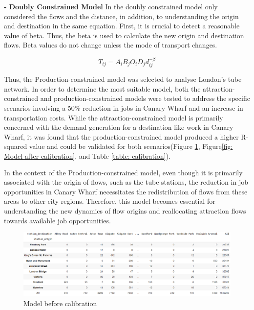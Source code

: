 \documentclass[10pt]{report}
\numberwithin{figure}{section}
\numberwithin{table}{section}
\begin{document}
\vspace{5mm} %
\textbf{- Doubly Constrained Model}
 In the doubly constrained model only considered the flows and the distance, in addition, to understanding the origin and destination in the same equation. First, it is crucial to detect a reasonable value of beta. Thus, the beta is used to calculate the new origin and destination flows. Beta values do not change unless the mode of transport changes. 

\begin{equation} \tag{4}
T_{ij} = A_i B_j O_i D_j d_{ij}^{-\beta}
\end{equation}

\newpage 

Thus, the Production-constrained model was selected to analyse London's tube network. In order to determine the most suitable model, both the attraction-constrained and production-constrained models were tested to address the specific scenarios involving a 50\% reduction in jobs in Canary Wharf and an increase in transportation costs. While the attraction-constrained model is primarily concerned with the demand generation for a destination like work in Canary Wharf, it was found that the production-constrained model produced a higher R-squared value and could be validated for both scenarios(Figure \ref{fig: Model before calibration}, Figure\ref{fig: Model after calibration}, and Table \ref{table: calibration}).

In the context of the Production-constrained model, even though it is primarily associated with the origin of flows, such as the tube stations, the reduction in job opportunities in Canary Wharf necessitates the redistribution of flows from these areas to other city regions. Therefore, this model becomes essential for understanding the new dynamics of flow origins and reallocating attraction flows towards available job opportunities.

    \begin{figure}[htp]
        \centering
        \includegraphics[width=16cm]{Image/Part2_OD.png}
        \caption{Model before calibration}
        \label{fig: Model before calibration}
    \end{figure}
\end{document}
